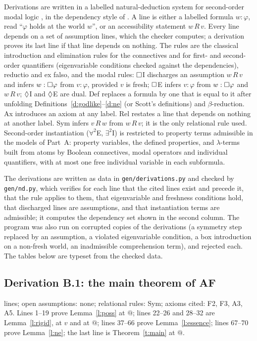 \documentclass{situationist-preprint}
\begin{document}
Derivations are written in a labelled natural-deduction system for second-order modal logic \citep{Vigano2000}, in the dependency style of \citet{Lemmon1965}. A line is either a labelled formula $w:\varphi$, read \enquote{$\varphi$ holds at the world $w$}, or an accessibility statement $w\,R\,v$. Every line depends on a set of assumption lines, which the checker computes; a derivation proves its last line if that line depends on nothing. The rules are the classical introduction and elimination rules for the connectives and for first- and second-order quantifiers (eigenvariable conditions checked against the dependencies), reductio and ex falso, and the modal rules: $\mathord{\Box}$I discharges an assumption $w\,R\,v$ and infers $w:\mathord{\Box}\varphi$ from $v:\varphi$, provided $v$ is fresh; $\mathord{\Box}$E infers $v:\varphi$ from $w:\mathord{\Box}\varphi$ and $w\,R\,v$; $\mathord{\Diamond}$I and $\mathord{\Diamond}$E are dual. Def replaces a formula by one that is equal to it after unfolding Definitions~\ref{d:godlike}--\ref{d:ne} (or Scott's definitions) and $\beta$-reduction. Ax introduces an axiom at any label. Rel restates a line that depends on nothing at another label. Sym infers $v\,R\,w$ from $w\,R\,v$; it is the only relational rule used. Second-order instantiation ($\forall^2$E, $\exists^2$I) is restricted to property terms admissible in the models of Part~A: property variables, the defined properties, and $\lambda$-terms built from atoms by Boolean connectives, modal operators and individual quantifiers, with at most one free individual variable in each subformula.

The derivations are written as data in \texttt{gen/derivations.py} and checked by \texttt{gen/nd.py}, which verifies for each line that the cited lines exist and precede it, that the rule applies to them, that eigenvariable and freshness conditions hold, that discharged lines are assumptions, and that instantiation terms are admissible; it computes the dependency set shown in the second column. The program was also run on corrupted copies of the derivations (a symmetry step replaced by an assumption, a violated eigenvariable condition, a box introduction on a non-fresh world, an inadmissible comprehension term), and rejected each. The tables below are typeset from the checked data.

\subsection{Derivation B.1: the main theorem of AF}

\csLinesAf{} lines; open assumptions: none; relational rules: Sym; axioms cited: F2, F3, A3, A5. Lines 1--19 prove Lemma~\ref{l:poss} at $@$; lines 22--26 and 28--32 are Lemma~\ref{l:rigid}, at $v$ and at $@$; lines 37--66 prove Lemma~\ref{l:essence}; lines 67--70 prove Lemma~\ref{l:ne}; the last line is Theorem~\ref{t:main} at $@$.
\end{document}
